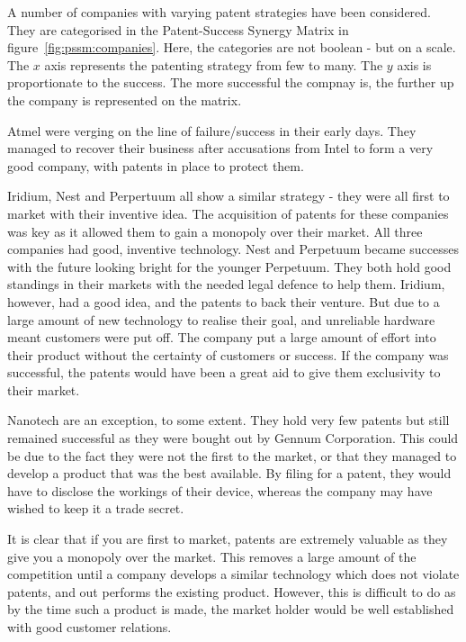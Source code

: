 {}

A number of companies with varying patent strategies have been considered.
They are categorised in the Patent-Success Synergy Matrix in figure~\ref{fig:pssm:companies}.
Here, the categories are not boolean - but on a scale. 
The $x$ axis represents the patenting strategy from few to many.
The $y$ axis is proportionate to the success. 
The more successful the compnay is, the further up the company is represented on the matrix.

Atmel were verging on the line of failure/success in their early days. 
They managed to recover their business after accusations from Intel to form a very good company, with patents in place to protect them.

Iridium, Nest and Perpertuum all show a similar strategy - they were all first to market with their inventive idea.
The acquisition of patents for these companies was key as it allowed them to gain a monopoly over their market. 
All three companies had good, inventive technology.
Nest and Perpetuum became successes with the future looking bright for the younger Perpetuum. 
They both hold good standings in their markets with the needed legal defence to help them.
Iridium, however, had a good idea, and the patents to back their venture. 
But due to a large amount of new technology to realise their goal, and unreliable hardware meant customers were put off.
The company put a large amount of effort into their product without the certainty of customers or success. 
If the company was successful, the patents would have been a great aid to give them exclusivity to their market.

Nanotech are an exception, to some extent.
They hold very few patents \cite{nanotechpatent} but still remained successful as they were bought out by Gennum Corporation. 
This could be due to the fact they were not the first to the market, or that they managed to develop a product that was the best available. 
By filing for a patent, they would have to disclose the workings of their device, whereas the company may have wished to keep it a trade secret.

It is clear that if you are first to market, patents are extremely valuable as they give you a monopoly over the market. 
This removes a large amount of the competition until a company develops a similar technology which does not violate patents, and out performs the existing product. 
However, this is difficult to do as by the time such a product is made, the market holder would be well established with good customer relations.

